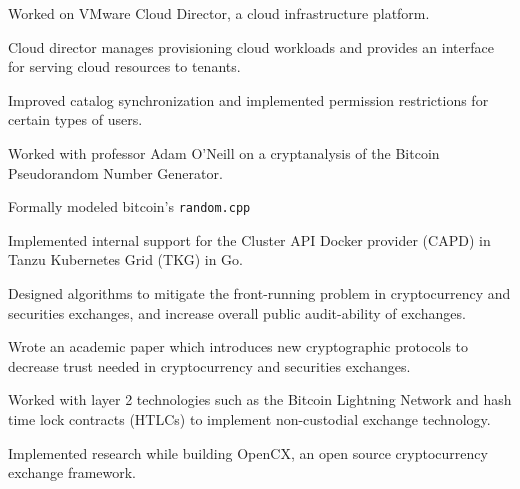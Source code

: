 
\begin{tightemize}
    \item Worked on VMware Cloud Director, a cloud infrastructure platform.
    \item Cloud director manages provisioning cloud workloads and provides an
        interface for serving cloud resources to tenants.
    \item Improved catalog synchronization and implemented permission
        restrictions for certain types of users.
\end{tightemize}
\subsectionsep

\begin{tightemize}
    \item Worked with professor Adam O'Neill on a cryptanalysis of the Bitcoin
        Pseudorandom Number Generator.
    \item Formally modeled bitcoin's \texttt{random.cpp}
\end{tightemize}
\subsectionsep

\begin{tightemize}
    \item Implemented internal support for the Cluster API Docker provider
        (CAPD) in Tanzu Kubernetes Grid (TKG) in Go.
\end{tightemize}
\subsectionsep

\begin{tightemize}
  \item Designed algorithms to mitigate the front-running problem in
      cryptocurrency and securities exchanges, and increase overall
      public audit-ability of exchanges.
  \item Wrote an academic paper which introduces new cryptographic protocols to
      decrease trust needed in cryptocurrency and securities exchanges.
  \item Worked with layer 2 technologies such as the Bitcoin Lightning
      Network and hash time lock contracts (HTLCs) to implement
      non-custodial exchange technology.
  \item Implemented research while building OpenCX, an open source
      cryptocurrency exchange framework.
\end{tightemize}
\subsectionsep

